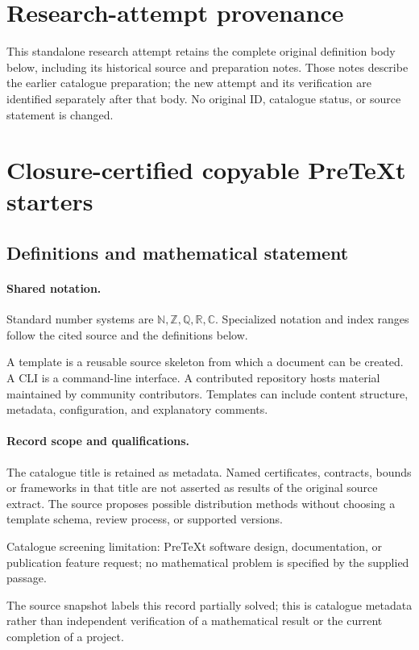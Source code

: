 \documentclass[11pt]{article}
\begin{document}
\section*{Research-attempt provenance}
This standalone research attempt retains the complete original definition body below,
including its historical source and preparation notes. Those notes describe the
earlier catalogue preparation; the new attempt and its verification are identified
separately after that body. No original ID, catalogue status, or source statement is changed.

\section{Closure-certified copyable PreTeXt starters}\label{statement}

\subsection{Definitions and mathematical statement}

\paragraph{Shared notation.}Standard number systems are $\mathbb N,\mathbb Z,\mathbb Q,\mathbb R,\mathbb C$. Specialized notation and index ranges follow the cited source and the definitions below.


A template is a reusable source skeleton from which a document can be created. A CLI is a command-line interface. A contributed repository hosts material maintained by community contributors. Templates can include content structure, metadata, configuration, and explanatory comments.
\paragraph{Record scope and qualifications.}
The catalogue title is retained as metadata. Named certificates, contracts, bounds or frameworks in that title are not asserted as results of the original source extract.
The source proposes possible distribution methods without choosing a template schema, review process, or supported versions.

Catalogue screening limitation: PreTeXt software design, documentation, or publication feature request; no mathematical problem is specified by the supplied passage.

The source snapshot labels this record partially solved; this is catalogue metadata rather than independent verification of a mathematical result or the current completion of a project.
\end{document}
